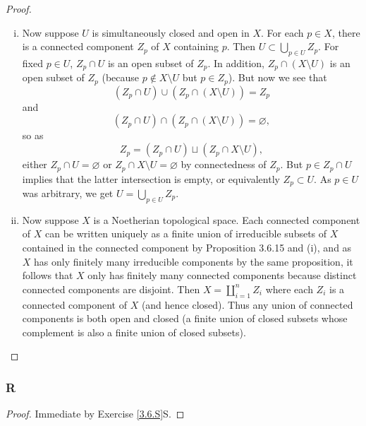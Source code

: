 \documentclass{article}
\let\emptyset\varnothing
\begin{document}
\begin{proof}
\begin{enumerate}[(i)]
        \item Now suppose $U$ is simultaneously closed and open in $X$. For each $p\in X$, there is a connected component $Z_p$ of $X$ containing $p$. Then $U\subset \bigcup_{p\in U} Z_p$. For fixed $p\in U$, $Z_p\cap U$ is an open subset of $Z_p$. In addition, $Z_p \cap (X\setminus U)$ is an open subset of $Z_p$ (because $p \notin X\setminus U$ but $p\in Z_p$). But now we see that
        \[
        (Z_p \cap U) \cup (Z_p \cap (X\setminus U)) = Z_p
        \]
        and
        \[
        (Z_p \cap U) \cap (Z_p \cap (X\setminus U)) = \emptyset,
        \]
        so as 
        \[
        Z_p = (Z_p \cap U) \sqcup (Z_p \cap X\setminus U),
        \]
        either $Z_p \cap U = \emptyset$ or $Z_p \cap X\setminus U= \emptyset$ by connectedness of $Z_p$. But $p\in Z_p\cap U$ implies that the latter intersection is empty, or equivalently $Z_p\subset U$. As $p\in U$ was arbitrary, we get $U=\bigcup_{p\in U} Z_p$.
        \item Now suppose $X$ is a Noetherian topological space. Each connected component of $X$ can be written uniquely as a finite union of irreducible subsets of $X$ contained in the connected component by Proposition 3.6.15 and (i), and as $X$ has only finitely many irreducible components by the same proposition, it follows that $X$ only has finitely many connected components because distinct connected components are disjoint. Then $X=\coprod_{i=1}^n Z_i$ where each $Z_i$ is a connected component of $X$ (and hence closed). Thus any union of connected components is both open and closed (a finite union of closed subsets whose complement is also a finite union of closed subsets).
    \end{enumerate}
\end{proof}
\subsubsection{R}\label{3.6.R}
\begin{proof}
    Immediate by Exercise \ref{3.6.S}S.
\end{proof}
\end{document}
